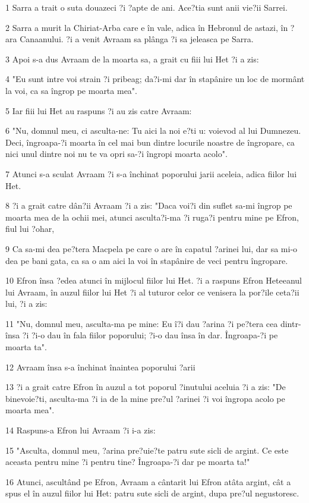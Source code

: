 \par 1 Sarra a trait o suta douazeci ?i ?apte de ani. Ace?tia sunt anii vie?ii Sarrei.
\par 2 Sarra a murit la Chiriat-Arba care e în vale, adica în Hebronul de astazi, în ?ara Canaanului. ?i a venit Avraam sa plânga ?i sa jeleasca pe Sarra.
\par 3 Apoi s-a dus Avraam de la moarta sa, a grait cu fiii lui Het ?i a zis:
\par 4 "Eu sunt intre voi strain ?i pribeag; da?i-mi dar în stapânire un loc de mormânt la voi, ca sa îngrop pe moarta mea".
\par 5 Iar fiii lui Het au raspuns ?i au zis catre Avraam:
\par 6 "Nu, domnul meu, ci asculta-ne: Tu aici la noi e?ti u: voievod al lui Dumnezeu. Deci, îngroapa-?i moarta în cel mai bun dintre locurile noastre de îngropare, ca nici unul dintre noi nu te va opri sa-?i îngropi moarta acolo".
\par 7 Atunci s-a sculat Avraam ?i s-a închinat poporului jarii aceleia, adica fiilor lui Het.
\par 8 ?i a grait catre dân?ii Avraam ?i a zis: "Daca voi?i din suflet sa-mi îngrop pe moarta mea de la ochii mei, atunci asculta?i-ma ?i ruga?i pentru mine pe Efron, fiul lui ?ohar,
\par 9 Ca sa-mi dea pe?tera Macpela pe care o are în capatul ?arinei lui, dar sa mi-o dea pe bani gata, ca sa o am aici la voi în stapânire de veci pentru îngropare.
\par 10 Efron însa ?edea atunci în mijlocul fiilor lui Het. ?i a raspuns Efron Heteeanul lui Avraam, în auzul fiilor lui Het ?i al tuturor celor ce venisera la por?ile ceta?ii lui, ?i a zis:
\par 11 "Nu, domnul meu, asculta-ma pe mine: Eu î?i dau ?arina ?i pe?tera cea dintr-însa ?i ?i-o dau în fala fiilor poporului; ?i-o dau însa în dar. Îngroapa-?i pe moarta ta".
\par 12 Avraam însa s-a închinat înaintea poporului ?arii
\par 13 ?i a grait catre Efron în auzul a tot poporul ?inutului aceluia ?i a zis: "De binevoie?ti, asculta-ma ?i ia de la mine pre?ul ?arinei ?i voi îngropa acolo pe moarta mea".
\par 14 Raspuns-a Efron lui Avraam ?i i-a zis:
\par 15 "Asculta, domnul meu, ?arina pre?uie?te patru sute sicli de argint. Ce este aceasta pentru mine ?i pentru tine? Îngroapa-?i dar pe moarta ta!"
\par 16 Atunci, ascultând pe Efron, Avraam a cântarit lui Efron atâta argint, cât a spus el în auzul fiilor lui Het: patru sute sicli de argint, dupa pre?ul negustoresc.
